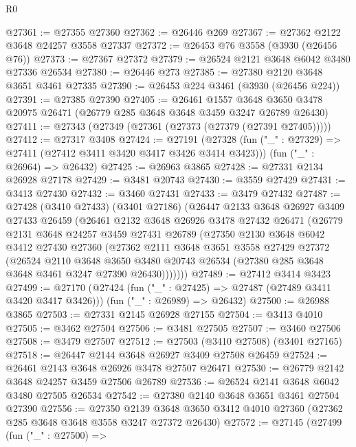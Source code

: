 \begin{lexlean}{R0}
\begin{coremodule}
@27361 := @27355 @27360
@27362 := @26446 @269
@27367 := @27362 @2122 @3648 @24257 @3558 @27337
@27372 := @26453 @76 @3558 (@3930 (@26456 @76))
@27373 := @27367 @27372
@27379 := @26524 @2121 @3648 @6042 @3480 @27336 @26534
@27380 := @26446 @273
@27385 := @27380 @2120 @3648 @3651 @3461 @27335
@27390 := @26453 @224 @3461 (@3930 (@26456 @224))
@27391 := @27385 @27390
@27405 := @26461
    @1557
    @3648
    @3650
    @3478
    @20975
    @26471
    (@26779 @285 @3648 @3648 @3459 @3247 @26789 @26430)
@27411 := @27343 (@27349 (@27361 (@27373 (@27379 (@27391 @27405)))))
@27412 := @27317 @3408
@27424 := @27191
    (@27328 (fun ("_" : @27329) => @27411 (@27412 @3411 @3420 @3417 @3426 @3414 @3423)))
    (fun ("_" : @26964) => @26432)
@27425 := @26963 @3865
@27428 := @27331 @2134 @26928 @27178
@27429 := @3481 @20743
@27430 := @3559 @27429
@27431 := @3413 @27430
@27432 := @3460 @27431
@27433 := @3479 @27432
@27487 := @27428
    (@3410 @27433)
    (@3401 @27186)
    (@26447
      @2133
      @3648
      @26927
      @3409
      @27433
      @26459
      (@26461
        @2132
        @3648
        @26926
        @3478
        @27432
        @26471
        (@26779
          @2131
          @3648
          @24257
          @3459
          @27431
          @26789
          (@27350
            @2130
            @3648
            @6042
            @3412
            @27430
            @27360
            (@27362
              @2111
              @3648
              @3651
              @3558
              @27429
              @27372
              (@26524
                @2110
                @3648
                @3650
                @3480
                @20743
                @26534
                (@27380 @285 @3648 @3648 @3461 @3247 @27390 @26430)))))))
@27489 := @27412 @3414 @3423
@27499 := @27170
    (@27424 (fun ("_" : @27425) => @27487 (@27489 @3411 @3420 @3417 @3426)))
    (fun ("_" : @26989) => @26432)
@27500 := @26988 @3865
@27503 := @27331 @2145 @26928 @27155
@27504 := @3413 @4010
@27505 := @3462 @27504
@27506 := @3481 @27505
@27507 := @3460 @27506
@27508 := @3479 @27507
@27512 := @27503 (@3410 @27508) (@3401 @27165)
@27518 := @26447 @2144 @3648 @26927 @3409 @27508 @26459
@27524 := @26461 @2143 @3648 @26926 @3478 @27507 @26471
@27530 := @26779 @2142 @3648 @24257 @3459 @27506 @26789
@27536 := @26524 @2141 @3648 @6042 @3480 @27505 @26534
@27542 := @27380 @2140 @3648 @3651 @3461 @27504 @27390
@27556 := @27350
    @2139
    @3648
    @3650
    @3412
    @4010
    @27360
    (@27362 @285 @3648 @3648 @3558 @3247 @27372 @26430)
@27572 := @27145
    (@27499
      (fun ("_" : @27500) =>

\end{coremodule}
\end{lexlean}
